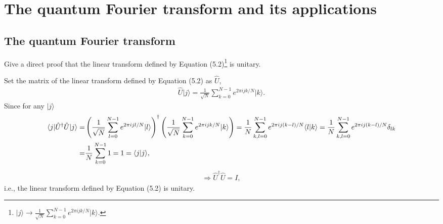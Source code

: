 \documentclass[en]{sol-man}
\begin{document}
\fi
\chapter{The quantum Fourier transform and its applications}

\section{The quantum Fourier transform}

\begin{exe}
    Give a direct proof that the linear transform defined by Equation (5.2)\footnote{\label{Equ-5.2}$\lvert j\rangle\longrightarrow\frac{1}{\sqrt{N}}\sum_{k=0}^{N-1}e^{2\pi ijk/N}\lvert k\rangle$.} is unitary.
\end{exe}
\begin{pf}
    Set the matrix of the linear transform defined by Equation (5.2) as $\hat{U}$,
    \begin{align}
        \hat{U}\lvert j\rangle=\frac{1}{\sqrt{N}}\sum_{k=0}^{N-1}e^{2\pi ijk/N}\lvert k\rangle.
    \end{align}
    Since for any $\lvert j\rangle$
    \begin{align}
        \notag\langle j\rvert\hat{U}^{\dagger}\hat{U}\lvert j\rangle=&\left(\frac{1}{\sqrt{N}}\sum_{l=0}^{N-1}e^{2\pi ijl/N}\lvert l\rangle\right)^{\dagger}\left(\frac{1}{\sqrt{N}}\sum_{k=0}^{N-1}e^{2\pi ijk/N}\lvert k\rangle\right)=\frac{1}{N}\sum_{k,l=0}^{N-1}e^{2\pi ij(k-l)/N}\langle l\vert k\rangle=\frac{1}{N}\sum_{k,l=0}^{N-1}e^{2\pi ij(k-l)/N}\delta_{lk}\\
        =&\frac{1}{N}\sum_{k=0}^{N-1}1=1=\langle j\vert j\rangle,
    \end{align}
    \begin{align}
        \Longrightarrow\hat{U}^{\dagger}\hat{U}=I,
    \end{align}
    i.e., the linear transform defined by Equation (5.2) is unitary.
\end{pf}

\ifx\allfiles\undefined
\end{document}
